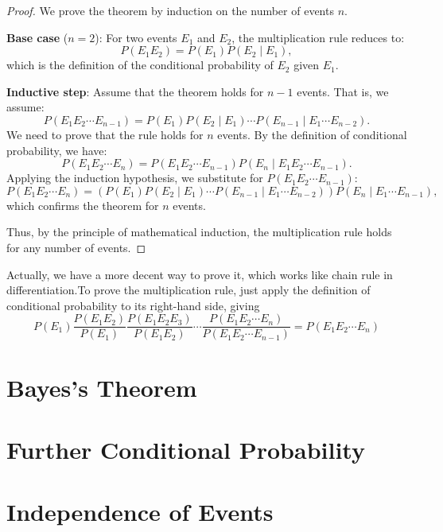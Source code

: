             \begin{proof}
            We prove the theorem by induction on the number of events \(n\).
            
            \textbf{Base case} (\(n = 2\)): For two events \(E_1\) and \(E_2\), the multiplication rule reduces to:
            \[
            P(E_1 E_2) = P(E_1) P(E_2 \mid E_1),
            \]
            which is the definition of the conditional probability of \(E_2\) given \(E_1\).
            
            \textbf{Inductive step}: Assume that the theorem holds for \(n-1\) events. That is, we assume:
            \[
            P(E_1 E_2 \cdots E_{n-1}) = P(E_1) P(E_2 \mid E_1) \cdots P(E_{n-1} \mid E_1 \cdots E_{n-2}).
            \]
            We need to prove that the rule holds for \(n\) events. By the definition of conditional probability, we have:
            \[
            P(E_1 E_2 \cdots E_n) = P(E_1 E_2 \cdots E_{n-1}) P(E_n \mid E_1 E_2 \cdots E_{n-1}).
            \]
            Applying the induction hypothesis, we substitute for \(P(E_1 E_2 \cdots E_{n-1})\):
            \[
            P(E_1 E_2 \cdots E_n) = \left(P(E_1) P(E_2 \mid E_1) \cdots P(E_{n-1} \mid E_1 \cdots E_{n-2})\right) P(E_n \mid E_1 \cdots E_{n-1}),
            \]
            which confirms the theorem for \(n\) events.
            
            Thus, by the principle of mathematical induction, the multiplication rule holds for any number of events.
        \end{proof}
        \begin{remark}
            Actually, we have a more decent way to prove it, which works like chain rule in differentiation.To prove the multiplication rule, just apply the definition of conditional probability
            to its right-hand side, giving
            \[P(E_1)\frac{P(E_1E_2)}{P(E_1)}\frac{P(E_1E_2E_3)}{P(E_1E_2)}\cdots\frac{P(E_1E_2\cdots E_n)}{P(E_1E_2\cdots E_{n-1})}=P(E_1E_2\cdots E_n)\]
        \end{remark}
\section{Bayes's Theorem}

\section{Further Conditional Probability}

\section{Independence of Events}
